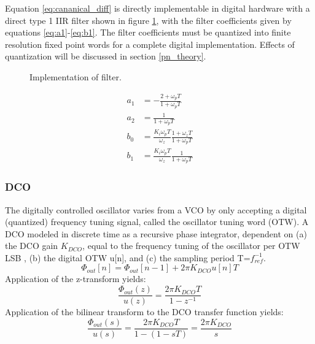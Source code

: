 		Equation \ref{eq:cananical_diff} is directly implementable in digital hardware with a direct type 1 IIR filter shown in figure \ref{fig:filt_imple}, with the filter coefficients given by equations \ref{eq:a1}-\ref{eq:b1}. The filter coefficients must be quantized into finite resolution fixed point words for a complete digital implementation. Effects of quantization will be discussed in section \ref{pn_theory}.
		\begin{figure}[htb!]
			\center
			\caption{Implementation of filter.}
			\label{fig:filt_imple}
		\end{figure}
		\begin{align}
			a_1 &= -\frac{2+\omega_pT}{1+\omega_pT}\label{eq:a1}\\
			a_2 &= \frac{1}{1+\omega_pT} \\
			b_0 &= \frac{K_i\omega_pT}{\omega_z}\frac{1+\omega_zT}{1+\omega_pT}\\
			b_1 &= \frac{K_i\omega_pT}{\omega_z}\frac{1}{1+\omega_pT}\label{eq:b1}
		\end{align}

	\subsubsection{DCO}
		The digitally controlled oscillator varies from a VCO by only accepting a digital (quantized) frequency tuning signal, called the oscillator tuning word (OTW). A DCO modeled in discrete time as a recursive phase integrator, dependent on (a) the DCO gain $K_{DCO}$, equal to the frequency tuning of the oscillator per OTW LSB , (b) the digital OTW u[n], and (c) the sampling period T=$f_{ref}^{-1}$.
		\begin{equation}
			\Phi_{out}[n] = \Phi_{out}[n-1] + 2\pi K_{DCO}u[n]T
		\end{equation}
		Application of the z-transform yields:
		\begin{equation}
			\frac{\Phi_{out}(z)}{u(z)} = \frac{2\pi K_{DCO}T}{1-z^{-1}}
		\end{equation}
		Application of the bilinear transform to the DCO transfer function yields:
		\begin{equation}
			\frac{\Phi_{out}(s)}{u(s)} = \frac{2\pi K_{DCO}T}{1-(1-sT)} = \frac{2\pi K_{DCO}}{s} 
		\end{equation}

